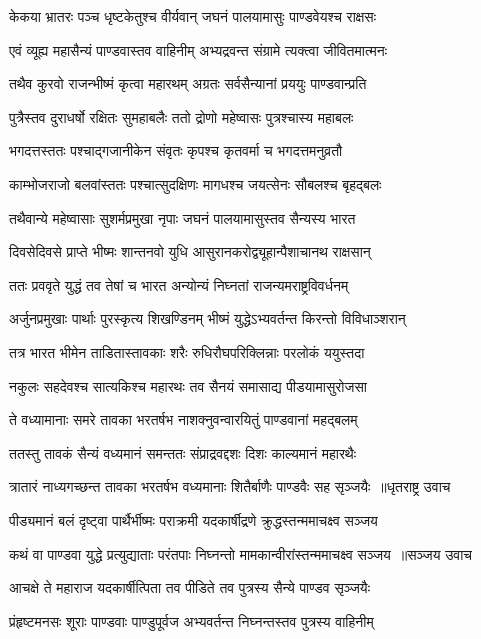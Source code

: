 \twolineshloka
{केकया भ्रातरः पञ्च धृष्टकेतुश्च वीर्यवान्}
{जघनं पालयामासुः पाण्डवेयश्च राक्षसः}


\twolineshloka
{एवं व्यूह्य महासैन्यं पाण्डवास्तव वाहिनीम्}
{अभ्यद्रवन्त संग्रामे त्यक्त्वा जीवितमात्मनः}


\twolineshloka
{तथैव कुरवो राजन्भीष्मं कृत्वा महारथम्}
{अग्रतः सर्वसैन्यानां प्रययुः पाण्डवान्प्रति}


\twolineshloka
{पुत्रैस्तव दुराधर्षो रक्षितः सुमहाबलैः}
{ततो द्रोणो महेष्वासः पुत्रश्चास्य महाबलः}


\twolineshloka
{भगदत्तस्ततः पश्चाद्गजानीकेन संवृतः}
{कृपश्च कृतवर्मा च भगदत्तमनुव्रतौ}


\twolineshloka
{काम्भोजराजो बलवांस्ततः पश्चात्सुदक्षिणः}
{मागधश्च जयत्सेनः सौबलश्च बृहद्बलः}


\twolineshloka
{तथैवान्ये महेष्वासाः सुशर्मप्रमुखा नृपाः}
{जघनं पालयामासुस्तव सैन्यस्य भारत}


\twolineshloka
{दिवसेदिवसे प्राप्ते भीष्मः शान्तनवो युधि}
{आसुरानकरोद्व्यूहान्पैशाचानथ राक्षसान्}


\twolineshloka
{ततः प्रववृते युद्धं तव तेषां च भारत}
{अन्योन्यं निघ्नतां राजन्यमराष्ट्रविवर्धनम्}


\twolineshloka
{अर्जुनप्रमुखाः पार्थाः पुरस्कृत्य शिखण्डिनम्}
{भीष्मं युद्धेऽभ्यवर्तन्त किरन्तो विविधाञ्शरान्}


\twolineshloka
{तत्र भारत भीमेन ताडितास्तावकाः शरैः}
{रुधिरौघपरिक्लिन्नाः परलोकं ययुस्तदा}


\twolineshloka
{नकुलः सहदेवश्च सात्यकिश्च महारथः}
{तव सैनयं समासाद्य पीडयामासुरोजसा}


\twolineshloka
{ते वध्यामानाः समरे तावका भरतर्षभ}
{नाशक्नुवन्वारयितुं पाण्डवानां महद्बलम्}


\twolineshloka
{ततस्तु तावकं सैन्यं वध्यमानं समन्ततः}
{संप्राद्रवद्दशः दिशः काल्यमानं महारथैः}


\threelineshloka
{त्रातारं नाध्यगच्छन्त तावका भरतर्षभ}
{वध्यमानाः शितैर्बाणैः पाण्डवैः सह सृञ्जयैः ॥धृतराष्ट्र उवाच}
{}


\twolineshloka
{पीड्यमानं बलं दृष्ट्वा पार्थैर्भीष्मः पराक्रमी}
{यदकार्षीद्रणे क्रुद्धस्तन्ममाचक्ष्व सञ्जय}


\threelineshloka
{कथं वा पाण्डवा युद्धे प्रत्युद्याताः परंतपाः}
{निघ्नन्तो मामकान्वीरांस्तन्ममाचक्ष्व सञ्जय ॥सञ्जय उवाच}
{}


\twolineshloka
{आचक्षे ते महाराज यदकार्षीत्पिता तव}
{पीडिते तव पुत्रस्य सैन्ये पाण्डव सृञ्जयैः}


\twolineshloka
{प्रंहृष्टमनसः शूराः पाण्डवाः पाण्डुपूर्वज}
{अभ्यवर्तन्त निघ्नन्तस्तव पुत्रस्य वाहिनीम्}



